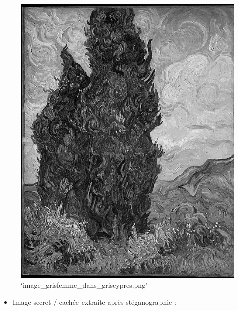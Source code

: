 \documentclass[11pt]{article}
\makeatletter
\def\maxwidth{\ifdim\Gin@nat@width>\linewidth\linewidth
    \else\Gin@nat@width\fi}
\let\Oldincludegraphics\includegraphics
\renewcommand{\includegraphics}[1]{\Oldincludegraphics[width=.8\maxwidth]{#1}}
\providecommand{\tightlist}{%
      \setlength{\itemsep}{0pt}\setlength{\parskip}{0pt}}
\makeatother
\begin{document}
\begin{figure}
\centering
\includegraphics{image_grisfemme_dans_griscypres.png}
\caption{`image\_grisfemme\_dans\_griscypres.png'}
\end{figure}

\begin{itemize}
\tightlist
\item
  Image secret / cachée extraite après stéganographie :
\end{itemize}
\end{document}
